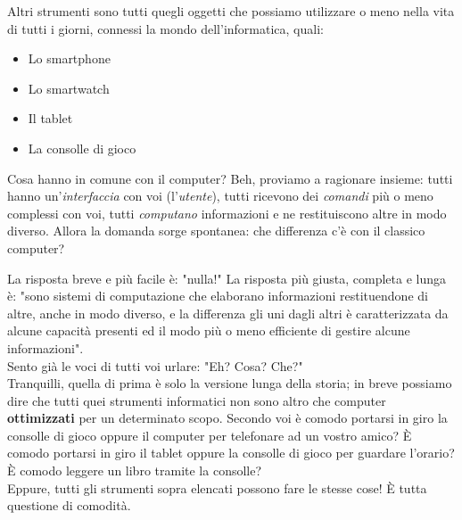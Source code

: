 \documentclass[12pt,fleqn,a4paper]{book} %
\begin{document}
    			Altri strumenti sono tutti quegli oggetti che possiamo utilizzare o meno nella vita di tutti i giorni, connessi la mondo dell'informatica, quali:
    			\begin{itemize}
    				\item Lo smartphone
    				\item Lo smartwatch
    				\item Il tablet
    				\item La consolle di gioco
    			\end{itemize}
    		
    			Cosa hanno in comune con il computer? Beh, proviamo a ragionare insieme: tutti hanno un'\textit{interfaccia} con voi (l'\textit{utente}), tutti ricevono dei \textit{comandi} più o meno complessi con voi, tutti \textit{computano} informazioni e ne restituiscono altre in modo diverso. Allora la domanda sorge spontanea: che differenza c'è con il classico computer?
    			
				La risposta breve e più facile è: "nulla!"
				La risposta più giusta, completa e lunga è: "sono sistemi di computazione che elaborano informazioni restituendone di altre, anche in modo diverso, e la differenza gli uni dagli altri è caratterizzata da alcune capacità presenti ed il modo più o meno efficiente di gestire alcune informazioni".\\
				
				Sento già le voci di tutti voi urlare: "Eh? Cosa? Che?"\\
				
				Tranquilli, quella di prima è solo la versione lunga della storia; in breve possiamo dire che tutti quei strumenti informatici non sono altro che computer \textbf{ottimizzati} per un determinato scopo. Secondo voi è comodo portarsi in giro la consolle di gioco oppure il computer per telefonare ad un vostro amico? È comodo portarsi in giro il tablet oppure la consolle di gioco per guardare l'orario? È comodo leggere un libro tramite la consolle?\\
				
				Eppure, tutti gli strumenti sopra elencati possono fare le stesse cose! È tutta questione di comodità.
				
\end{document}
